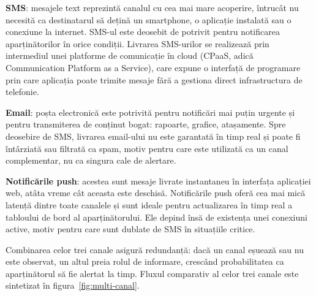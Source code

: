﻿\documentclass[12pt,a4paper,twoside]{article}
\begin{document}
\textbf{SMS}: mesajele text reprezintă canalul cu cea mai mare acoperire, întrucât nu necesită ca destinatarul să dețină un smartphone, o aplicație instalată sau o conexiune la internet. SMS-ul este deosebit de potrivit pentru notificarea aparținătorilor în orice condiții. Livrarea SMS-urilor se realizează prin intermediul unei platforme de comunicație în cloud (CPaaS, adică Communication Platform as a Service), care expune o interfață de programare prin care aplicația poate trimite mesaje fără a gestiona direct infrastructura de telefonie.

\textbf{Email}: poșta electronică este potrivită pentru notificări mai puțin urgente și pentru transmiterea de conținut bogat: rapoarte, grafice, atașamente. Spre deosebire de SMS, livrarea email-ului nu este garantată în timp real și poate fi întârziată sau filtrată ca spam, motiv pentru care este utilizată ca un canal complementar, nu ca singura cale de alertare.

\textbf{Notificările push}: acestea sunt mesaje livrate instantaneu în interfața aplicației web, atâta vreme cât aceasta este deschisă. Notificările push oferă cea mai mică latență dintre toate canalele și sunt ideale pentru actualizarea în timp real a tabloului de bord al aparținătorului. Ele depind însă de existența unei conexiuni active, motiv pentru care sunt dublate de SMS în situațiile critice.

Combinarea celor trei canale asigură redundanță: dacă un canal eșuează sau nu este observat, un altul preia rolul de informare, crescând probabilitatea ca aparținătorul să fie alertat la timp. Fluxul comparativ al celor trei canale este sintetizat în figura~\ref{fig:multi-canal}.
\end{document}
